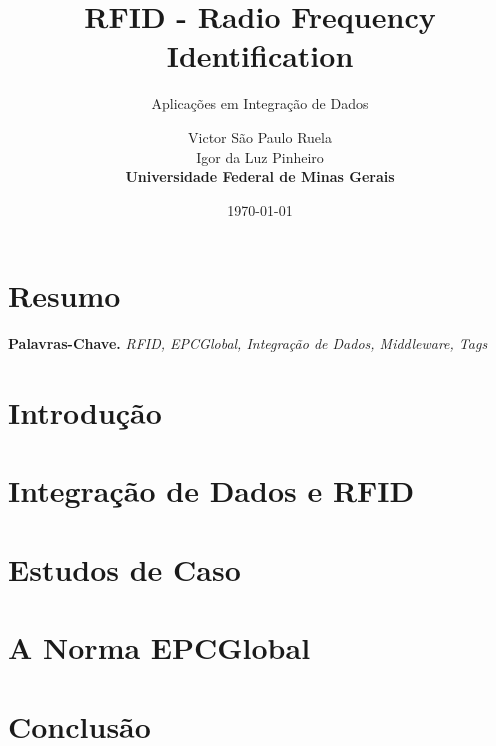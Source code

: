 \documentclass[a4paper,12pt,titlepage]{scrartcl}
\begin{document}
\title{RFID - Radio Frequency Identification}
\subtitle{Aplicações em Integração de Dados}
\author{Victor São Paulo Ruela \\ Igor da Luz Pinheiro \\ \textbf{Universidade Federal de Minas Gerais}}
\date{\today}

\maketitle

\tableofcontents
\newpage 
\listoffigures

\listoftables
\newpage

\section*{Resumo}


\smallskip
\noindent \textbf{Palavras-Chave.} \textit{RFID, EPCGlobal, Integração de Dados, Middleware, Tags	}

\newpage

\section{Introdução}

\newpage

\section{Integração de Dados e RFID}

\newpage

\section{Estudos de Caso}

\newpage

\section{A Norma EPCGlobal}

\newpage

\section{Conclusão}


\newpage

\nocite{*}

\end{document}
